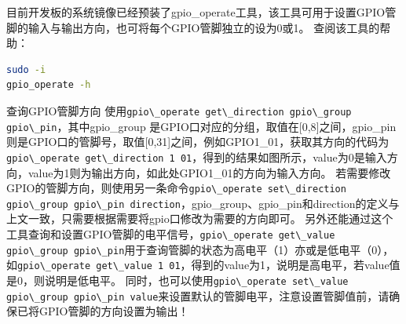 目前开发板的系统镜像已经预装了gpio\_operate工具，该工具可用于设置GPIO管脚的输入与输出方向，也可将每个GPIO管脚独立的设为0或1。
查阅该工具的帮助：

\begin{lstlisting}[language=bash]
sudo -i
gpio_operate -h
\end{lstlisting}

查询GPIO管脚方向
使用\passthrough{\lstinline!gpio\_operate get\_direction gpio\_group gpio\_pin!}，其中gpio\_group
是GPIO口对应的分组，取值在{[}0,8{]}之间，gpio\_pin则是GPIO口的管脚号，取值{[}0,31{]}之间，例如GPIO1\_01，获取其方向的代码为\passthrough{\lstinline!gpio\_operate get\_direction 1 01!}，得到的结果如图所示，value为0是输入方向，value为1则为输出方向，如此处GPIO1\_01的方向为输入方向。
若需要修改GPIO的管脚方向，则使用另一条命令\passthrough{\lstinline!gpio\_operate set\_direction gpio\_group gpio\_pin direction!}，gpio\_group、gpio\_pin和direction的定义与上文一致，只需要根据需要将gpio口修改为需要的方向即可。
另外还能通过这个工具查询和设置GPIO管脚的电平信号，\passthrough{\lstinline!gpio\_operate get\_value gpio\_group gpio\_pin!}用于查询管脚的状态为高电平（1）亦或是低电平（0），如\passthrough{\lstinline!gpio\_operate get\_value 1 01!}，得到的value为1，说明是高电平，若value值是0，则说明是低电平。
同时，也可以使用\passthrough{\lstinline!gpio\_operate set\_value gpio\_group gpio\_pin value!}来设置默认的管脚电平，注意设置管脚值前，请确保已将GPIO管脚的方向设置为输出！

